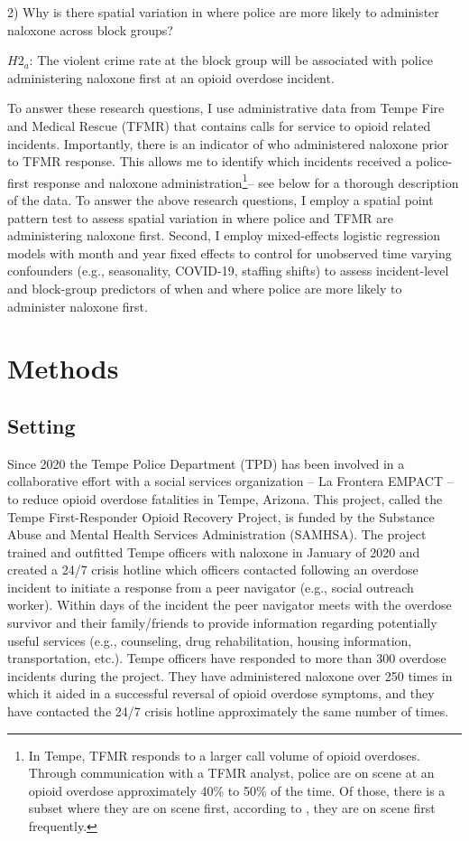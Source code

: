 2) Why is there spatial variation in where police are more likely to administer naloxone across block groups? 

\begin{flushleft}
\(H2_a\): The violent crime rate at the block group will be associated with police administering naloxone first at an opioid overdose incident.
\end{flushleft}

To answer these research questions, I use administrative data from Tempe Fire and Medical Rescue (TFMR) that contains calls for service to opioid related incidents. Importantly, there is an indicator of who administered naloxone prior to TFMR response. This allows me to identify which incidents received a police-first response and naloxone administration\footnote{In Tempe, TFMR responds to a larger call volume of opioid overdoses. Through communication with a TFMR analyst, police are on scene at an opioid overdose approximately 40\% to 50\% of the time. Of those, there is a subset where they are on scene first, according to \textcite{white_leveraging_2022}, they are on scene first frequently.}-- see below for a thorough description of the data. To answer the above research questions, I employ a spatial point pattern test to assess spatial variation in where police and TFMR are administering naloxone first. Second, I employ mixed-effects logistic regression models with month and year fixed effects to control for unobserved time varying confounders (e.g., seasonality, COVID-19, staffing shifts) to assess incident-level and block-group predictors of when and where police are more likely to administer naloxone first.

\section{Methods}
\subsection{Setting}

Since 2020 the Tempe Police Department (TPD) has been involved in a collaborative effort with a social services organization – La Frontera EMPACT – to reduce opioid overdose fatalities in Tempe, Arizona. This project, called the Tempe First-Responder Opioid Recovery Project, is funded by the Substance Abuse and Mental Health Services Administration (SAMHSA). The project trained and outfitted Tempe officers with naloxone in January of 2020 and created a 24/7 crisis hotline which officers contacted following an overdose incident to initiate a response from a peer navigator (e.g., social outreach worker). Within days of the incident the peer navigator meets with the overdose survivor and their family/friends to provide information regarding potentially useful services (e.g., counseling, drug rehabilitation, housing information, transportation, etc.). Tempe officers have responded to more than 300 overdose incidents during the project. They have administered naloxone over 250 times in which it aided in a successful reversal of opioid overdose symptoms, and they have contacted the 24/7 crisis hotline approximately the same number of times. 

